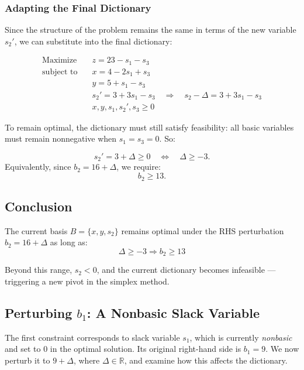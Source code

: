 \subsubsection*{Adapting the Final Dictionary}

Since the structure of the problem remains the same in terms of the new variable \( s_2' \), we can substitute into the final dictionary:

\[
\begin{aligned}
\text{Maximize} \quad 
& z = 23 - s_1 - s_3 \\
\text{subject to} \quad 
& x = 4 - 2s_1 + s_3 \\
& y = 5 + s_1 - s_3 \\
& s_2'  = 3 + 3s_1 - s_3 
\quad \Rightarrow \quad
s_2 - \Delta = 3  + 3s_1 - s_3 \\
& x, y, s_1, s_2', s_3 \geq 0
\end{aligned}
\]

To remain optimal, the dictionary must still satisfy feasibility: all basic variables must remain nonnegative when \( s_1 = s_3 = 0 \). So:

\[
s_2' = 3 + \Delta \geq 0 \quad \Longleftrightarrow \quad \boxed{\Delta \geq -3}.
\]
Equivalently, since \( b_2 = 16 + \Delta \), we require:
\[
\boxed{b_2 \geq 13}.
\]


\subsection*{Conclusion}

The current basis \( B = \{x, y, s_2\} \) remains optimal under the RHS perturbation \( b_2 = 16 + \Delta \) as long as:
\[
\boxed{\Delta \geq -3} \Rightarrow b_2 \geq 13
\]

Beyond this range, \( s_2 < 0 \), and the current dictionary becomes infeasible — triggering a new pivot in the simplex method.


\subsection{Perturbing \( b_1 \): A Nonbasic Slack Variable}

The first constraint corresponds to slack variable \( s_1 \), which is currently \emph{nonbasic} and set to 0 in the optimal solution. Its original right-hand side is \( b_1 = 9 \). We now perturb it to \( 9 + \Delta \), where \( \Delta \in \mathbb{R} \), and examine how this affects the dictionary.

